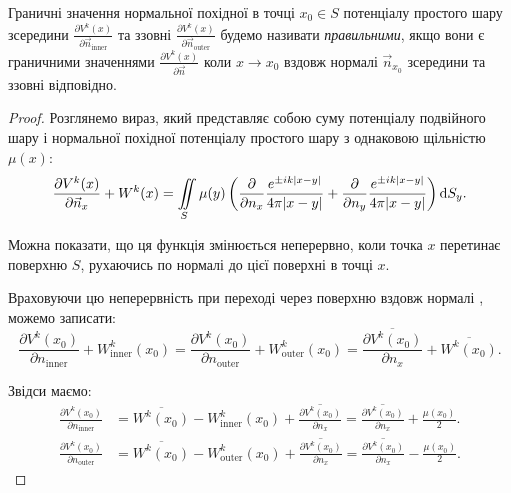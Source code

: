\begin{definition}
	Граничні значення нормальної похідної в точці $x_0 \in S$ потенціалу простого шару зсередини $\frac{\partial V^k(x)}{\partial \vec n_{\text{inner}}}$ та ззовні $\frac{\partial V^k(x)}{\partial \vec n_{\text{outer}}}$ будемо називати \textit{правильними}, якщо вони є граничними значеннями $\frac{\partial V^k(x)}{\partial \vec n}$ коли $x \to x_0$ вздовж нормалі $\vec n_{x_0}$ зсередини та ззовні відповідно.
\end{definition}

\begin{proof}
	Розглянемо вираз, який представляє собою суму потенціалу подвійного шару і нормальної похідної потенціалу простого шару з  однаковою щільністю $\mu(x)$:
	\begin{equation}
		\frac{\partial V^k(x)}{\partial \vec n_x} + W^k(x) = \displaystyle\iint\limits_S \mu(y) \left( \frac{\partial}{\partial n_x} \frac{e^{\pm i k |x - y|}}{4 \pi |x - y|} + \frac{\partial}{\partial n_y} \frac{e^{\pm i k |x - y|}}{4 \pi |x - y|} \right) \mathop{}\!\mathrm{d} S_y.
	\end{equation}

	Можна показати, що ця функція змінюється неперервно, коли точка $x$ перетинає поверхню $S$, рухаючись по нормалі до цієї поверхні в точці $x$. \medskip

	Враховуючи цю неперервність при переході через поверхню вздовж нормалі , можемо записати:
	\begin{equation}
		\frac{\partial V^k(x_0)}{\partial n_{\text{inner}}} + W_{\text{inner}}^k(x_0) = \frac{\partial V^k(x_0)}{\partial n_{\text{outer}}} + W_{\text{outer}}^k(x_0) = \overline{\frac{\partial V^k(x_0)}{\partial n_x}} + \overline{W^k(x_0)}.
	\end{equation}

	Звідси маємо:
	\begin{align}
		\frac{\partial V^k(x_0)}{\partial n_{\text{inner}}} &= \overline{W^k(x_0)} - W_{\text{inner}}^k(x_0) + \overline{\frac{\partial V^k(x_0)}{\partial n_x}} = \overline{\frac{\partial V^k(x_0)}{\partial n_x}} + \frac{\mu(x_0)}{2}. \\
		\frac{\partial V^k(x_0)}{\partial n_{\text{outer}}} &= \overline{W^k(x_0)} - W_{\text{outer}}^k(x_0) + \overline{\frac{\partial V^k(x_0)}{\partial n_x}} = \overline{\frac{\partial V^k(x_0)}{\partial n_x}} - \frac{\mu(x_0)}{2}.
	\end{align}
\end{proof}

